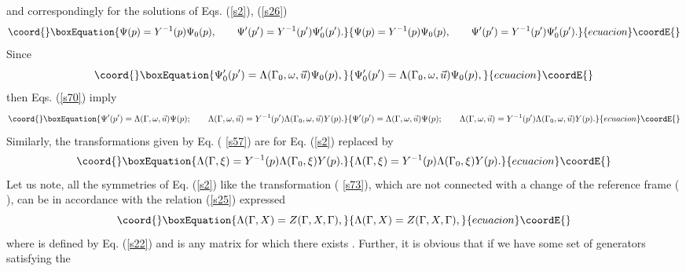 \documentclass[a4paper,a4paper]{article}
\begin{document}
and correspondingly for the solutions of Eqs. (\ref{s2}), (\ref{s26}) 
\begin{equation}\coord{}\boxEquation{
\Psi (p)=Y^{-1}(p)\Psi _{0}(p),\qquad \Psi ^{\prime }(p^{\prime
})=Y^{-1}(p^{\prime })\Psi _{0}^{\prime }(p^{\prime }).  \label{s70}
}{
\Psi (p)=Y^{-1}(p)\Psi _{0}(p),\qquad \Psi ^{\prime }(p^{\prime
})=Y^{-1}(p^{\prime })\Psi _{0}^{\prime }(p^{\prime }).  }{ecuacion}\coordE{}\end{equation}%
Since 
\begin{equation}\coord{}\boxEquation{
\Psi _{0}^{\prime }(p^{\prime })=\Lambda (\Gamma _{0},\omega ,\vec{u})\Psi
_{0}(p),  \label{s71}
}{
\Psi _{0}^{\prime }(p^{\prime })=\Lambda (\Gamma _{0},\omega ,\vec{u})\Psi
_{0}(p),  }{ecuacion}\coordE{}\end{equation}%
then Eqs. (\ref{s70}) imply 
\begin{equation}\coord{}\boxEquation{
\Psi ^{\prime }(p^{\prime })=\Lambda (\Gamma ,\omega ,\vec{u})\Psi
(p);\qquad \Lambda (\Gamma ,\omega ,\vec{u})=Y^{-1}(p^{\prime })\Lambda
(\Gamma _{0},\omega ,\vec{u})Y(p).  \label{s72}
}{
\Psi ^{\prime }(p^{\prime })=\Lambda (\Gamma ,\omega ,\vec{u})\Psi
(p);\qquad \Lambda (\Gamma ,\omega ,\vec{u})=Y^{-1}(p^{\prime })\Lambda
(\Gamma _{0},\omega ,\vec{u})Y(p).  }{ecuacion}\coordE{}\end{equation}%
Similarly, the transformations \coordHE{} given by Eq. (%
\ref{s57}) are for Eq. (\ref{s2}) replaced by 
\begin{equation}\coord{}\boxEquation{
\Lambda (\Gamma ,\xi )=Y^{-1}(p)\Lambda (\Gamma _{0},\xi )Y(p).  \label{s73}
}{
\Lambda (\Gamma ,\xi )=Y^{-1}(p)\Lambda (\Gamma _{0},\xi )Y(p).  }{ecuacion}\coordE{}\end{equation}%
Let us note, all the symmetries of Eq. (\ref{s2}) like the transformation (%
\ref{s73}), which are not connected with a change of the reference frame (\coordHE{}%
), can be in accordance with the relation (\ref{s25}) expressed 
\begin{equation}\coord{}\boxEquation{
\Lambda (\Gamma ,X)=Z(\Gamma ,X,\Gamma ),  \label{s74}
}{
\Lambda (\Gamma ,X)=Z(\Gamma ,X,\Gamma ),  }{ecuacion}\coordE{}\end{equation}%
where \coordHE{} is defined by Eq. (\ref{s22}) and \coordHE{} is any matrix for which
there exists \coordHE{}. Further, it is obvious that if we
have some set of generators \coordHE{} satisfying the
\end{document}
